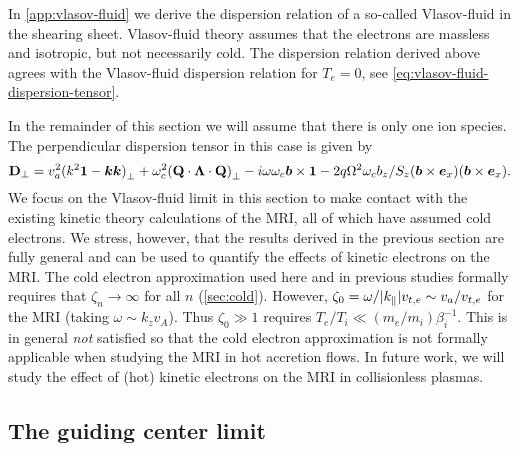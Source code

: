 \documentclass[aps,pre,notitlepage,amsmath,amssymb,amsfonts,nobibnotes,nofootinbib,superscriptaddress]{revtex4-1}
\begin{document}
In \cref{app:vlasov-fluid} we derive the dispersion relation of a so-called
Vlasov-fluid in the shearing sheet. Vlasov-fluid theory \citep{Freidberg1972}
assumes that the electrons are massless and isotropic, but not necessarily
cold. The dispersion relation derived above agrees with the Vlasov-fluid
dispersion relation for $T_e=0$, see \cref{eq:vlasov-fluid-dispersion-tensor}.

In the remainder of this section we will assume that there is only one ion
species. The perpendicular dispersion tensor in this case is given by
\begin{equation}
  \label{eq:perpendicular-dispersion-single}
  \mathbf{D}_\perp =
  \va^2{(k^2\mathbf{1} - \vec{k}\vec{k})}_\perp
  + \omc^2{(\mathbf{Q}\cdot\mathbf{\Lambda}\cdot\mathbf{Q})}_\perp
  - i\omega\omc\vec{b}\times\mathbf{1}
  - 2q\Omega^2\omc b_z/S_z
  (\vec{b}\times\ex)(\vec{b}\times\ex).
\end{equation}
We focus on the Vlasov-fluid limit in this section to make contact with the
existing kinetic theory calculations of the MRI, all of which have assumed
cold electrons. We stress, however, that the results derived in the previous
section are fully general and can be used to quantify the effects of kinetic
electrons on the MRI\@. The cold electron approximation used here and in
previous studies formally requires that $\zeta_n\rightarrow\infty$ for all $n$
(\cref{sec:cold}). However,
$\zeta_0=\omega/|k_\parallel|v_{t,e}\sim{}v_a/v_{t,e}$ for the MRI (taking
$\omega\sim{}k_z{}v_A$). Thus $\zeta_0\gg{}1$ requires
$T_e/T_i\ll(m_e/m_i)\beta_i^{-1}$. This is in general \emph{not} satisfied so
that the cold electron approximation is not formally applicable when studying
the MRI in hot accretion flows. In future work, we will study the effect of
(hot) kinetic electrons on the MRI in collisionless plasmas.

\subsection{The guiding center limit}
\label{sec:guiding-center}
\end{document}
